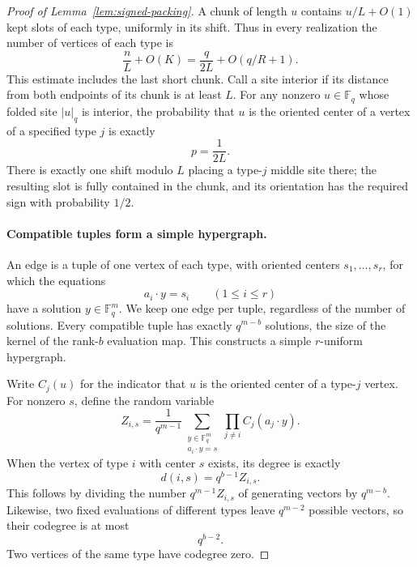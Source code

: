 \begin{proof}[Proof of Lemma~\ref{lem:signed-packing}]
A chunk of length $u$ contains $u/L+O(1)$ kept slots of each type,
uniformly in its shift.  Thus in every realization the number of
vertices of each type is
\begin{equation}
 \frac nL+O(K)=\frac q{2L}+O(q/R+1).
 \label{eq:packing-vertex-count}
\end{equation}
This estimate includes the last short chunk.  Call a site interior if
its distance from both endpoints of its chunk is at least $L$.
For any nonzero $u\in\mathbb F_q$ whose folded site $|u|_q$ is interior,
the probability that $u$ is the oriented center of a vertex of a specified
type $j$ is exactly
\begin{equation}
 p=\frac1{2L}.
 \label{eq:packing-center-probability}
\end{equation}
There is exactly one shift modulo $L$ placing a type-$j$ middle site
there; the resulting slot is fully contained in the chunk, and its
orientation has the required sign with probability $1/2$.

\paragraph{Compatible tuples form a simple hypergraph.}
An edge is a tuple of one vertex of each type, with oriented centers
$s_1,\ldots,s_r$, for which the equations
\[
 a_i\cdot y=s_i\qquad(1\le i\le r)
\]
have a solution $y\in\mathbb F_q^m$.  We keep one edge per tuple,
regardless of the number of solutions.  Every compatible tuple has
exactly $q^{m-b}$ solutions, the size of the kernel of the rank-$b$
evaluation map.  This constructs a simple $r$-uniform hypergraph.

Write $C_j(u)$ for the indicator that $u$ is the oriented center of a
type-$j$ vertex.  For nonzero $s$, define the random variable
\[
 Z_{i,s}=\frac1{q^{m-1}}
 \sum_{\substack{y\in\mathbb F_q^m\\a_i\cdot y=s}}
       \prod_{j\ne i}C_j(a_j\cdot y).
\]
When the vertex of type $i$ with center $s$ exists, its degree is exactly
\begin{equation}
 d(i,s)=q^{b-1}Z_{i,s}.
 \label{eq:packing-degree}
\end{equation}
This follows by dividing the number $q^{m-1}Z_{i,s}$ of generating
vectors by $q^{m-b}$.  Likewise, two fixed evaluations of different
types leave $q^{m-2}$ possible vectors, so their codegree is at most
\begin{equation}
 q^{b-2}.
 \label{eq:packing-codegree}
\end{equation}
Two vertices of the same type have codegree zero.


\end{proof}
